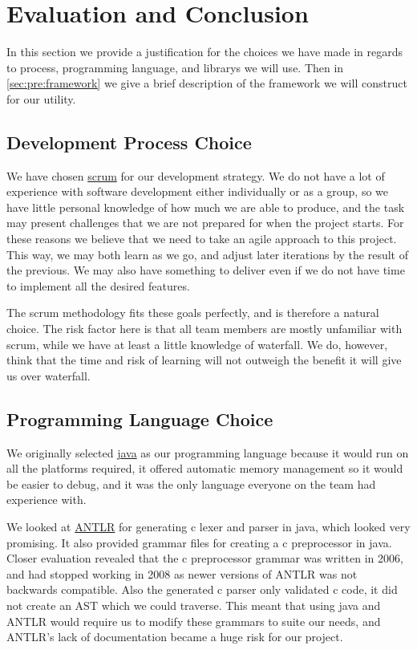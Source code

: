 \section{Evaluation and Conclusion}
\label{sec:pre:eval}
In this section we provide a justification for the choices we have made in
regards to process, programming language, and \glspl{library} we will use. Then
in \autoref{sec:pre:framework} we give a brief description of the framework
we will construct for our \gls{utility}.

\subsection{Development Process Choice}
\label{sec:pre:devchoice}
We have chosen \hyperref[sec:pre:scrum]{\Gls{scrum}} for our development strategy.
We do not have a lot of experience with software development either
individually or as a group, so we have little personal knowledge of how much
we are able to produce, and the task may present challenges that we are not
prepared for when the project starts. For these reasons we believe that we
need to take an agile approach to this project. This way, we may both learn as
we go, and adjust later iterations by the result of the previous. We may also
have something to deliver even if we do not have time to implement all the
desired features.

The \Gls{scrum} methodology fits these goals perfectly, and is therefore a natural
choice. The risk factor here is that all team members are mostly unfamiliar
with \Gls{scrum}, while we have at least a little knowledge of waterfall. We do,
however, think that the time and risk of learning will not outweigh
the benefit it will give us over waterfall.

\subsection{Programming Language Choice}
\label{sec:pre:langchoice}
We originally selected \hyperref[sec:pre:java]{\Gls{java}} as our programming
language because it would run on all the platforms required, it offered
automatic memory management so it would be easier to debug, and it was the only
language everyone on the team had experience with.

We looked at \hyperref[sec:pre:antlr]{ANTLR} for generating
\Gls{c} \gls{lexer} and \gls{parser} in \Gls{java}, which looked very promising. It also provided
grammar files for creating a \Gls{c} \gls{preprocessor} in \Gls{java}. Closer evaluation revealed
that the \Gls{c} \gls{preprocessor} grammar was written in 2006, and had stopped working in
2008 as newer versions of ANTLR was not backwards compatible. Also the
generated \Gls{c} \gls{parser} only validated \Gls{c} code, it did not create an \gls{AST}
which we could traverse. This meant that using \Gls{java} and ANTLR would
require us to modify these grammars to suite our needs, and ANTLR's lack of
documentation became a huge risk for our project.

